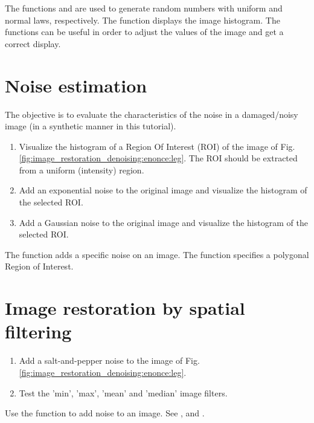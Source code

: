\begin{mcomment}
\begin{mremark}
The \matlabregistered{} functions  and  are used to generate random numbers with uniform and normal laws, respectively. The 
function displays the image histogram. The  functions can be useful in order to adjust the values of the image and get a correct display.
\end{mremark}
\end{mcomment}


\section{Noise estimation}
The objective is to evaluate the characteristics of the noise in a damaged/noisy image (in a synthetic manner in this tutorial).
\begin{qbox}
\begin{enumerate}
	\item Visualize the histogram of a Region Of Interest (ROI) of the image of Fig.\ref{fig:image_restoration_denoising:enonce:leg}.
	The ROI should be extracted from a uniform (intensity) region. 
	\item Add an exponential noise to the original image and visualize the histogram of the selected ROI.
	\item Add a Gaussian noise to the original image and visualize the histogram of the selected ROI.
\end{enumerate}
\end{qbox}
\begin{mcomment}
\begin{mremark}
The  function  adds a specific noise on an image. The function  specifies a polygonal Region of Interest.
\end{mremark}
\end{mcomment}


\section{Image restoration by spatial filtering}
\begin{qbox}
\begin{enumerate}
	\item Add a salt-and-pepper noise to the image of Fig.\ref{fig:image_restoration_denoising:enonce:leg}. 
	\item Test the 'min', 'max', 'mean' and 'median' image filters. 
	\end{enumerate}	
\end{qbox}
\begin{mcomment}
\begin{mremark}
 Use the  function  to add noise to an image. See ,  and .
\end{mremark}
\end{mcomment}

